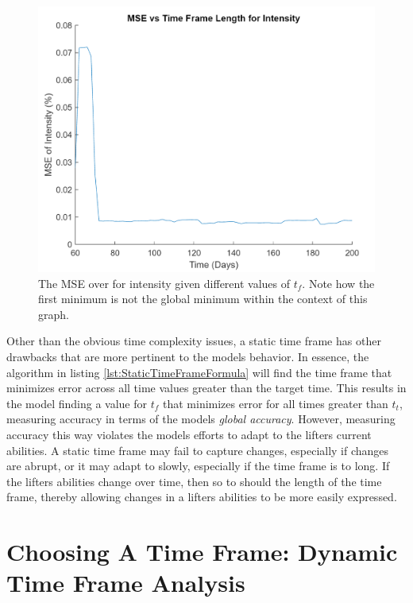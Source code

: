 \begin{figure}[h]
    \centering
    \includegraphics[width=140mm]{ActualVsPredValues/MSEvsStaticTimeFrame.png}
    \caption{The MSE over for intensity given different values of $t_f$. Note how the first minimum is not the global minimum within the context of this graph.}
    \label{fig:MSEStaticTimeFrame}
\end{figure}

Other than the obvious time complexity issues, a static time frame has other drawbacks that are more pertinent to the models behavior. In essence, the algorithm in listing \ref{lst:StaticTimeFrameFormula} will find the time frame that minimizes error across all time values greater than the target time. This results in the model finding a value for $t_f$ that minimizes error for all times greater than $t_t$, measuring accuracy in terms of the models \textit{global accuracy}. However, measuring accuracy this way violates the models efforts to adapt to the lifters current abilities. A static time frame may fail to capture changes, especially if changes are abrupt, or it may adapt to slowly, especially if the time frame is to long. If the lifters abilities change over time, then so to should the length of the time frame, thereby allowing changes in a lifters abilities to be more easily expressed.

\section{Choosing A Time Frame: Dynamic Time Frame Analysis}
\label{sec:TimeFrameDynamicTimeFrameAnalysis}

